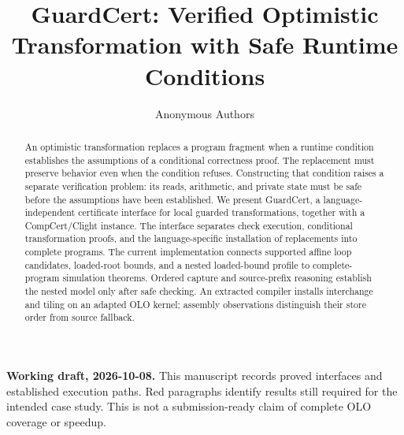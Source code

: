 \documentclass[runningheads]{llncs}
\newcommand{\guardcert}{GuardCert}
\begin{document}
\title{GuardCert: Verified Optimistic Transformation with Safe Runtime Conditions}
\author{Anonymous Authors}
\maketitle

\begin{abstract}
An optimistic transformation replaces a program fragment when a runtime
condition establishes the assumptions of a conditional correctness proof.
The replacement must preserve behavior even when the condition refuses.
Constructing that condition raises a separate verification problem: its reads,
arithmetic, and private state must be safe before the assumptions have been
established. We present \guardcert, a language-independent certificate interface
for local guarded transformations, together with a CompCert/Clight instance.
The interface separates check execution, conditional transformation proofs,
and the language-specific installation of replacements into complete programs.
The current implementation connects supported affine loop candidates,
loaded-root bounds, and a nested loaded-bound profile to complete-program
simulation theorems. Ordered capture and source-prefix reasoning establish
the nested model only after safe checking. An extracted compiler installs
interchange and tiling on an adapted OLO kernel; assembly observations
distinguish their store order from source fallback.
\end{abstract}

\noindent\textbf{Working draft, 2026-10-08.}
This manuscript records proved interfaces and established execution paths.
Red paragraphs identify results still required for the intended case study.
This is not a submission-ready claim of complete OLO coverage or speedup.









\end{document}
